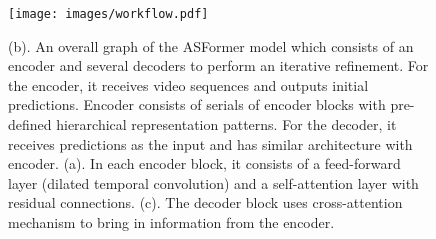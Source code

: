 \documentclass{bmvc2k}
\begin{document}
\begin{figure}[t]
	\centering
	\texttt{[image: images/workflow.pdf]}
	\caption{(b). An overall graph of the ASFormer model which consists of an encoder and several decoders to perform an iterative refinement. For the encoder, it receives video sequences and outputs initial predictions. Encoder consists of serials of encoder blocks with pre-defined hierarchical representation patterns. For the decoder, it receives predictions as the input and has similar architecture with encoder. (a). In each encoder block, it consists of a feed-forward layer (dilated temporal convolution) and a self-attention layer with residual connections.  (c). The decoder block uses cross-attention mechanism to bring in information from the encoder.}
	\label{workflow}
	\vspace{-0.3cm}
\end{figure}
\end{document}
